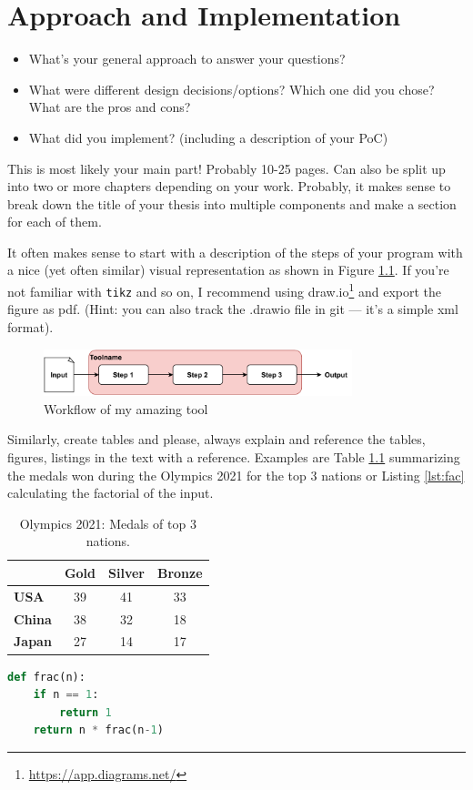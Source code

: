 \chapter{Approach and Implementation}
\label{chapter:Approach}

\begin{itemize}
\item What's your general approach to answer your questions?
\item What were different design decisions/options? Which one did you chose?
What are the pros and cons?
\item What did you implement? (including a description of your PoC)
\end{itemize}

This is most likely your main part! Probably 10-25 pages. Can also be split up
into two or more chapters depending on your work. Probably, it makes sense to
break down the title of your thesis into multiple components and make a section
for each of them.

It often makes sense to start with a description of the steps of your program
with a nice (yet often similar) visual representation as shown in Figure
\ref{fig:tool_overview}. If you're not familiar with \texttt{tikz} and so on, I
recommend using draw.io\footnote{\url{https://app.diagrams.net/}} and export the
figure as pdf. (Hint: you can also track the .drawio file in git --- it's a
simple xml format).

\begin{figure}[ht]
\centering
\includegraphics[width=0.8\textwidth]{figures/generic_figure.pdf}
\caption{Workflow of my amazing tool}
\label{fig:tool_overview}
\end{figure}


Similarly, create tables and please, always explain and reference the tables,
figures, listings in the text with a reference. Examples are Table
\ref{tab:example_tab} summarizing the medals won during the Olympics 2021 for
the top 3 nations or Listing \ref{lst:fac} calculating the factorial of the
input.

\begin{table}[ht]
\centering
\caption{Olympics 2021: Medals of top 3 nations.}
\label{tab:example_tab}
\begin{tabular}{| l | c | c | c |}\hline
& \textbf{Gold} & \textbf{Silver} & \textbf{Bronze}\\\hline
\textbf{USA} & 39 & 41 & 33 \\\hline
\textbf{China} & 38 & 32 & 18 \\\hline
\textbf{Japan} & 27 & 14 & 17 \\\hline
\end{tabular}
\end{table}

\begin{lstlisting}[language=python,caption={Function computing the factorial},label={lst:fac}]
def frac(n):
    if n == 1:
        return 1
    return n * frac(n-1)
\end{lstlisting}
